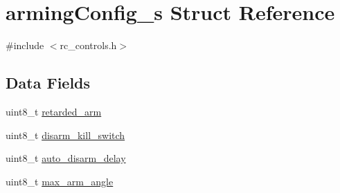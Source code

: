 \hypertarget{structarmingConfig__s}{\section{arming\+Config\+\_\+s Struct Reference}
\label{structarmingConfig__s}
}


{\ttfamily \#include $<$rc\+\_\+controls.\+h$>$}

\subsection*{Data Fields}
\begin{DoxyCompactItemize}
\item 
uint8\+\_\+t \hyperlink{structarmingConfig__s_a288dfd22c89e7f164fdb779b4f251628}{retarded\+\_\+arm}
\item 
uint8\+\_\+t \hyperlink{structarmingConfig__s_a6b61ba9e0a5b2fa77aed58129c747100}{disarm\+\_\+kill\+\_\+switch}
\item 
uint8\+\_\+t \hyperlink{structarmingConfig__s_af351a405ac9eec7106a9a2869df4f489}{auto\+\_\+disarm\+\_\+delay}
\item 
uint8\+\_\+t \hyperlink{structarmingConfig__s_a1fda417cbd7d2449f0015afeb8fe7073}{max\+\_\+arm\+\_\+angle}
\end{DoxyCompactItemize}


